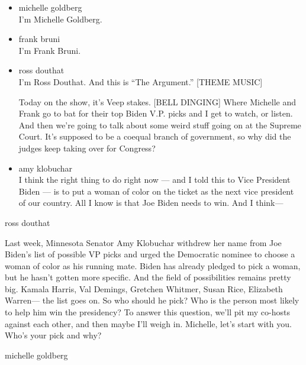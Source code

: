 \begin{itemize}
\item
  michelle goldberg\\
  I'm Michelle Goldberg.
\item
  frank bruni\\
  I'm Frank Bruni.
\item
  ross douthat\\
  I'm Ross Douthat. And this is ``The Argument.'' {[}THEME MUSIC{]}

  Today on the show, it's Veep stakes. {[}BELL DINGING{]} Where Michelle
  and Frank go to bat for their top Biden V.P. picks and I get to watch,
  or listen. And then we're going to talk about some weird stuff going
  on at the Supreme Court. It's supposed to be a coequal branch of
  government, so why did the judges keep taking over for Congress?
\item
  amy klobuchar\\
  I think the right thing to do right now --- and I told this to Vice
  President Biden --- is to put a woman of color on the ticket as the
  next vice president of our country. All I know is that Joe Biden needs
  to win. And I think---
\end{itemize}

ross douthat

Last week, Minnesota Senator Amy Klobuchar withdrew her name from Joe
Biden's list of possible VP picks and urged the Democratic nominee to
choose a woman of color as his running mate. Biden has already pledged
to pick a woman, but he hasn't gotten more specific. And the field of
possibilities remains pretty big. Kamala Harris, Val Demings, Gretchen
Whitmer, Susan Rice, Elizabeth Warren--- the list goes on. So who should
he pick? Who is the person most likely to help him win the presidency?
To answer this question, we'll pit my co-hosts against each other, and
then maybe I'll weigh in. Michelle, let's start with you. Who's your
pick and why?

michelle goldberg

